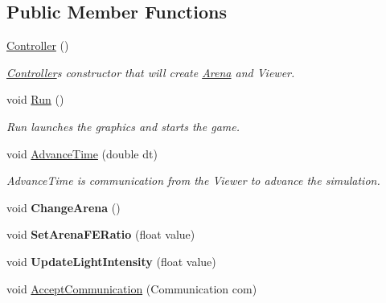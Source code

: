 \subsection*{Public Member Functions}
\begin{DoxyCompactItemize}
\item 
\hyperlink{classController_a95c56822d667e94b031451729ce069a9}{Controller} ()\hypertarget{classController_a95c56822d667e94b031451729ce069a9}{}\label{classController_a95c56822d667e94b031451729ce069a9}

\begin{DoxyCompactList}\small\item\em \hyperlink{classController}{Controller}\textquotesingle{}s constructor that will create \hyperlink{classArena}{Arena} and Viewer. \end{DoxyCompactList}\item 
void \hyperlink{classController_a17abb2cec6c0109e9b2df3cdc082eaad}{Run} ()\hypertarget{classController_a17abb2cec6c0109e9b2df3cdc082eaad}{}\label{classController_a17abb2cec6c0109e9b2df3cdc082eaad}

\begin{DoxyCompactList}\small\item\em Run launches the graphics and starts the game. \end{DoxyCompactList}\item 
void \hyperlink{classController_a6a4a3eaee03f6c4718da3f8293d7e053}{Advance\+Time} (double dt)
\begin{DoxyCompactList}\small\item\em Advance\+Time is communication from the Viewer to advance the simulation. \end{DoxyCompactList}\item 
void {\bfseries Change\+Arena} ()\hypertarget{classController_a43f4f5244b752dfbc9585d29dc798058}{}\label{classController_a43f4f5244b752dfbc9585d29dc798058}

\item 
void {\bfseries Set\+Arena\+F\+E\+Ratio} (float value)\hypertarget{classController_a4ec0f6afedb6d894aec84ac3521995c2}{}\label{classController_a4ec0f6afedb6d894aec84ac3521995c2}

\item 
void {\bfseries Update\+Light\+Intensity} (float value)\hypertarget{classController_a9a86d4a37d3eefb73b54238a32d74547}{}\label{classController_a9a86d4a37d3eefb73b54238a32d74547}

\item 
void \hyperlink{classController_a55b8d46984535adb91f40309914e8852}{Accept\+Communication} (Communication com)\hypertarget{classController_a55b8d46984535adb91f40309914e8852}{}\label{classController_a55b8d46984535adb91f40309914e8852}


\end{DoxyCompactItemize}
